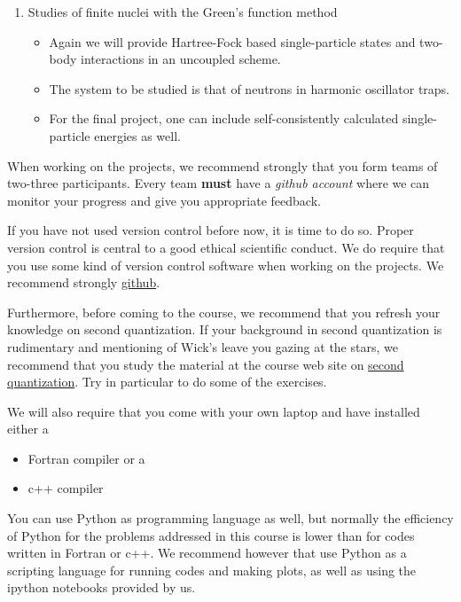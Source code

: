 \documentclass[%
twoside,                 %
final,                   %
10pt]{article}
\begin{document}
\begin{enumerate}
\begin{itemize}
\end{itemize}

\noindent
\item Studies of finite nuclei with the Green's function method
\begin{itemize}

  \item Again we will provide Hartree-Fock based single-particle states and two-body interactions in an uncoupled scheme.

  \item The system to be studied is that of neutrons in harmonic oscillator traps. 

  \item For the final project, one can include self-consistently calculated single-particle energies as well.
\end{itemize}

\noindent
\end{enumerate}

\noindent
When working on the projects, we recommend strongly that you form teams of two-three participants. Every team
\textbf{must} have a \emph{github account} where we can monitor your progress and give you appropriate feedback.

If you have not used version control before now, it is time to do so. 
Proper version control is central to a good ethical scientific conduct. 
We do require that you use some kind of version control software when working on the projects. We recommend strongly \href{{https://github.com/}}{github}. 

Furthermore, before coming to the course, we recommend that you refresh your knowledge on second quantization.
If your background in second quantization is rudimentary and mentioning of Wick's leave you gazing at the stars,
we recommend that you study the material at the course web site on \href{{http://nucleartalent.github.io/Course2ManyBodyMethods/doc/pub/secondquant/html/secondquant-bs.html}}{second quantization}. Try in particular to do some of the exercises.

We will also require that you come with your own laptop and have installed either a
\begin{itemize}
\item Fortran compiler or a 

\item c++ compiler
\end{itemize}

\noindent
You can use Python as programming language as well, but normally the efficiency of Python for the problems addressed in this course is lower than for codes written in Fortran or c++. We recommend however that use Python as a scripting language for running codes and making plots, as well as using the ipython notebooks provided by us.  
\end{document}
